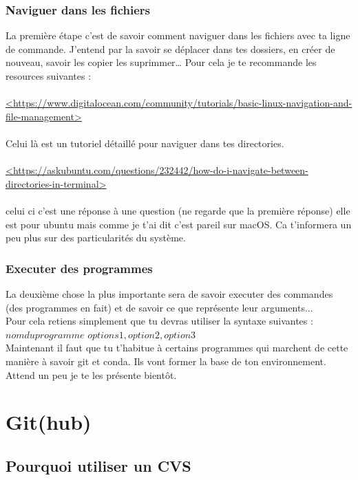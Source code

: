 \documentclass[10pt,a4paper]{book}
\begin{document}
\subsubsection{Naviguer dans les fichiers}
La première étape c'est de savoir comment naviguer dans les fichiers avec ta ligne de commande. J'entend par la savoir se déplacer dans tes dossiers, en créer de nouveau, savoir les copier les suprimmer\ldots
Pour cela je te recommande les resources suivantes : 
\\\\
\url{<https://www.digitalocean.com/community/tutorials/basic-linux-navigation-and-file-management>} 
\\\\
Celui là est un tutoriel détaillé pour naviguer dans tes directories.
\\\\
\url{<https://askubuntu.com/questions/232442/how-do-i-navigate-between-directories-in-terminal>}
\\\\
celui ci c'est une réponse à une question (ne regarde que la première réponse) elle est pour ubuntu mais comme je t'ai dit c'est pareil sur macOS. Ca t'informera un peu plus sur des particularités du système.

\subsubsection{Executer des programmes}
La deuxième chose la plus importante sera de savoir executer des commandes (des programmes en fait) et de savoir ce que représente leur arguments...
\\
Pour cela retiens simplement que tu devras utiliser la syntaxe suivantes :
\\
\textbf{$nomduprogramme$} \textit{$options1, option2, option3$}
\\
Maintenant il faut que tu t'habitue à certains programmes qui marchent de cette manière à savoir git et conda. Ils vont former la base de ton environnement.
Attend un peu je te les présente bientôt.

\section{Git(hub)}

\subsection{Pourquoi utiliser un CVS}
\end{document}
